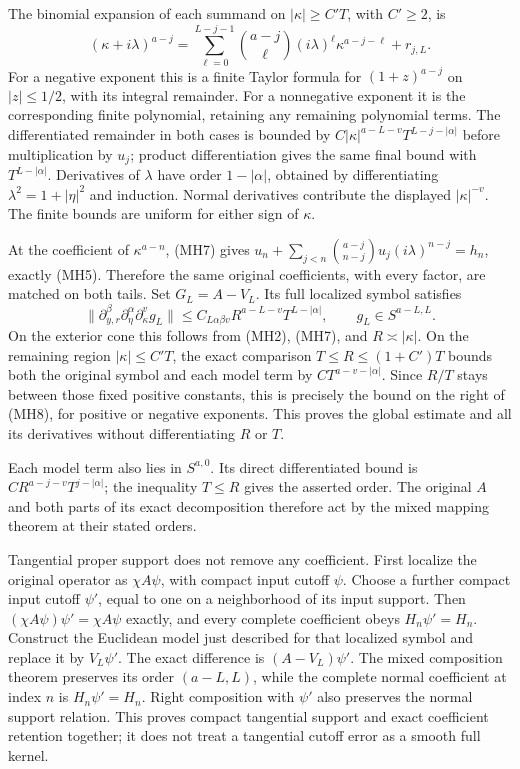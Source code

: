 \documentclass[
  11pt,
]{article}
\begin{document}
The binomial expansion of each summand on \(|\kappa|\geq C'T\), with
\(C'\geq2\), is \[
 (\kappa+i\lambda)^{a-j}
 =\sum_{\ell=0}^{L-j-1}
   \binom{a-j}{\ell}(i\lambda)^\ell\kappa^{a-j-\ell}
   +r_{j,L}.
 \tag{MH7}
\] For a negative exponent this is a finite Taylor formula for
\((1+z)^{a-j}\) on \(|z|\leq1/2\), with its integral remainder. For a
nonnegative exponent it is the corresponding finite polynomial,
retaining any remaining polynomial terms. The differentiated remainder
in both cases is bounded by \(C|\kappa|^{a-L-v}T^{L-j-|\alpha|}\) before
multiplication by \(u_j\); product differentiation gives the same final
bound with \(T^{L-|\alpha|}\). Derivatives of \(\lambda\) have order
\(1-|\alpha|\), obtained by differentiating \(\lambda^2=1+|\eta|^2\) and
induction. Normal derivatives contribute the displayed
\(|\kappa|^{-v}\). The finite bounds are uniform for either sign of
\(\kappa\).

At the coefficient of \(\kappa^{a-n}\), (MH7) gives
\(u_n+\sum_{j<n}\binom{a-j}{n-j}u_j(i\lambda)^{n-j}=h_n\), exactly
(MH5). Therefore the same original coefficients, with every factor, are
matched on both tails. Set \(G_L=A-V_L\). Its full localized symbol
satisfies \[
 \|\partial_{y,r}^{\beta}\partial_\eta^\alpha
          \partial_\kappa^v g_L\|
 \leq C_{L\alpha\beta v}
       R^{a-L-v}T^{L-|\alpha|},
 \qquad g_L\in S^{a-L,L}.
 \tag{MH8}
\] On the exterior cone this follows from (MH2), (MH7), and
\(R\asymp|\kappa|\). On the remaining region \(|\kappa|\leq C'T\), the
exact comparison \(T\leq R\leq(1+C')T\) bounds both the original symbol
and each model term by \(CT^{a-v-|\alpha|}\). Since \(R/T\) stays
between those fixed positive constants, this is precisely the bound on
the right of (MH8), for positive or negative exponents. This proves the
global estimate and all its derivatives without differentiating \(R\) or
\(T\).

Each model term also lies in \(S^{a,0}\). Its direct differentiated
bound is \(CR^{a-j-v}T^{j-|\alpha|}\); the inequality \(T\leq R\) gives
the asserted order. The original \(A\) and both parts of its exact
decomposition therefore act by the mixed mapping theorem at their stated
orders.

Tangential proper support does not remove any coefficient. First
localize the original operator as \(\chi A\psi\), with compact input
cutoff \(\psi\). Choose a further compact input cutoff \(\psi'\), equal
to one on a neighborhood of its input support. Then
\((\chi A\psi)\psi'=\chi A\psi\) exactly, and every complete coefficient
obeys \(H_n\psi'=H_n\). Construct the Euclidean model just described for
that localized symbol and replace it by \(V_L\psi'\). The exact
difference is \((A-V_L)\psi'\). The mixed composition theorem preserves
its order \((a-L,L)\), while the complete normal coefficient at index
\(n\) is \(H_n\psi'=H_n\). Right composition with \(\psi'\) also
preserves the normal support relation. This proves compact tangential
support and exact coefficient retention together; it does not treat a
tangential cutoff error as a smooth full kernel.
\end{document}
